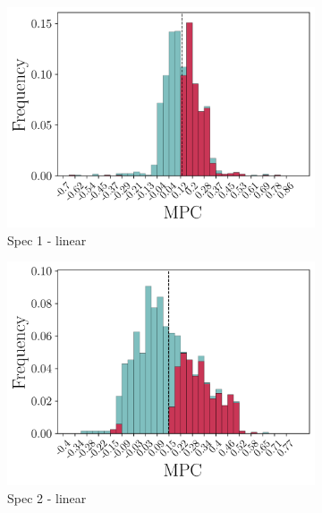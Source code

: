 \begin{figure}[t]
    \centering
    \begin{subfigure}{0.33\linewidth}
        \includegraphics[width=\linewidth]{figures/distributions/spec1_lin_chSNDexp.png}
        \caption{Spec 1 - linear}
    \end{subfigure}\hfill
    \begin{subfigure}{0.33\linewidth}
        \includegraphics[width=\linewidth]{figures/distributions/spec2_lin_chSNDexp.png}
        \caption{Spec 2 - linear}
    \end{subfigure}\hfill
    \begin{subfigure}{0.33\linewidth}

\end{subfigure}
\end{figure}
